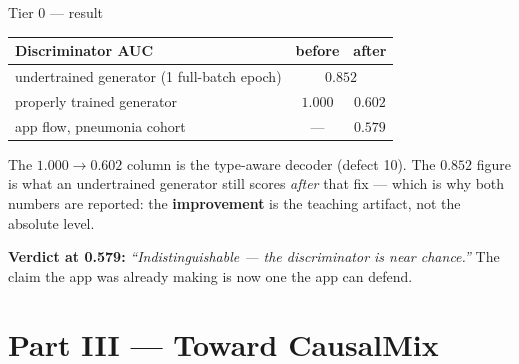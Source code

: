 \documentclass[aspectratio=169]{beamer}
\begin{document}
\begin{frame}{Tier 0 --- result}
  \small
  \begin{center}
  \begin{tabular}{@{}lcc@{}}
    \toprule
    \textbf{Discriminator AUC} & \textbf{before} & \textbf{after} \\
    \midrule
    undertrained generator (1 full-batch epoch) & \multicolumn{2}{c}{$0.852$} \\
    properly trained generator                  & $1.000$ & $\mathbf{0.602}$ \\
    \midrule
    app flow, pneumonia cohort                  & --- & $\mathbf{0.579}$ \\
    \bottomrule
  \end{tabular}
  \end{center}

  \vspace{0.4em}
  \small The $1.000 \to 0.602$ column is the type-aware decoder (defect 10). The
  $0.852$ figure is what an undertrained generator still scores \emph{after} that fix
  --- which is why both numbers are reported: the \textbf{improvement} is the teaching
  artifact, not the absolute level.

  \vspace{0.6em}
  \textbf{Verdict at 0.579:} \textit{``Indistinguishable --- the discriminator is near
  chance.''} The claim the app was already making is now one the app can defend.
\end{frame}

\section{Part III --- Toward CausalMix}
\end{document}
